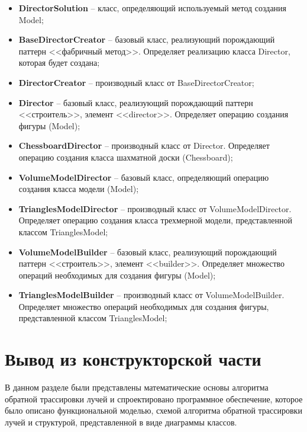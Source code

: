 \begin{itemize}
	\item \textbf{DirectorSolution} -- класс, определяющий используемый метод создания Model;
	\item \textbf{BaseDirectorCreator} -- базовый класс, реализующий порождающий паттерн <<фабричный метод>>. Определяет реализацию класса Director, которая будет создана;
	\item \textbf{DirectorCreator} -- производный класс от BaseDirectorCreator;
	\item \textbf{Director} -- базовый класс, реализующий порождающий паттерн <<строитель>>, элемент <<director>>. Определяет операцию создания фигуры (Model);
	\item \textbf{ChessboardDirector} -- производный класс от Director. Определяет операцию создания класса шахматной доски (Chessboard);
	\item \textbf{VolumeModelDirector} -- базовый класс, определяющий операцию создания класса модели (Model);
	\item \textbf{TrianglesModelDirector} -- производный класс от VolumeModelDirector. Определяет операцию создания класса трехмерной модели, представленной классом TrianglesModel;
	\item \textbf{VolumeModelBuilder} -- базовый класс, реализующий порождающий паттерн <<строитель>>, элемент <<builder>>. Определяет множество операций необходимых для создания фигуры (Model);
	\item \textbf{TrianglesModelBuilder} -- производный класс от VolumeModelBuilder. Определяет множество операций необходимых для создания фигуры, представленной классом TrianglesModel;	
\end{itemize}


\section*{Вывод из конструкторской части}
В данном разделе были представлены математические основы алгоритма обратной трассировки лучей и спроектировано программное обеспечение, которое было описано функциональной моделью, схемой алгоритма обратной трассировки лучей и структурой, представленной в виде диаграммы классов.

\clearpage

